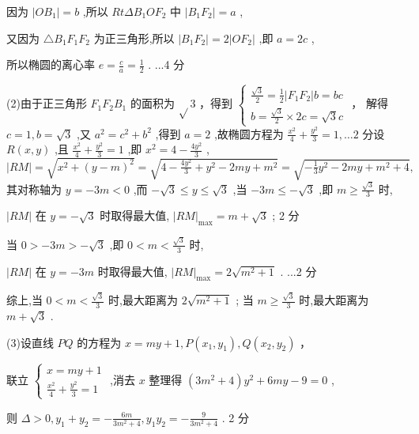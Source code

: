 \documentclass[10pt]{article}
\begin{document}
因为 \(\left| {O{B}_{1}}\right|  = b\) ,所以 \({Rt\Delta }{B}_{1}O{F}_{2}\) 中 \(\left| {{B}_{1}{F}_{2}}\right|  = a\) ,

又因为 \(\bigtriangleup {B}_{1}{F}_{1}{F}_{2}\) 为正三角形,所以 \(\left| {{B}_{1}{F}_{2}}\right|  = 2\left| {O{F}_{2}}\right|\) ,即 \(a = {2c}\) ,

所以椭圆的离心率 \(e = \frac{c}{a} = \frac{1}{2}\) . ...4 分

(2)由于正三角形 \({F}_{1}{F}_{2}{B}_{1}\) 的面积为 \(\sqrt{}3\) ，得到 \(\left\{  \begin{array}{l} \frac{\sqrt{3}}{2} = \frac{1}{2}\left| {{F}_{1}{F}_{2}}\right| b = {bc} \\  b = \frac{\sqrt{3}}{2} \times  {2c} = \sqrt{3}c \end{array}\right.\) ， 解得 \(c = 1,b = \sqrt{3}\) ,又 \({a}^{2} = {c}^{2} + {b}^{2}\) ,得到 \(a = 2\) ,故椭圆方程为 \(\frac{{x}^{2}}{4} + \frac{{y}^{2}}{3} = 1,\ldots 2\) 分设 \(R\left( {x,y}\right)\) ,且 \(\frac{{x}^{2}}{4} + \frac{{y}^{2}}{3} = 1\) ,即 \({x}^{2} = 4 - \frac{4{y}^{2}}{3}\) , \(\left| {RM}\right|  = \sqrt{{x}^{2} + {\left( y - m\right) }^{2}} = \sqrt{4 - \frac{4{y}^{2}}{3} + {y}^{2} - {2my} + {m}^{2}} = \sqrt{-\frac{1}{3}{y}^{2} - {2my} + {m}^{2} + 4},\) 其对称轴为 \(y =  - {3m} < 0\) ,而 \(- \sqrt{3} \leq  y \leq  \sqrt{3}\) ,当 \(- {3m} \leq   - \sqrt{3}\) ,即 \(m \geq  \frac{\sqrt{3}}{3}\) 时,

\(\left| {RM}\right|\) 在 \(y =  - \sqrt{3}\) 时取得最大值, \({\left| RM\right| }_{\max } = m + \sqrt{3}\) ; 2 分

当 \(0 >  - {3m} >  - \sqrt{3}\) ,即 \(0 < m < \frac{\sqrt{3}}{3}\) 时,

\(\left| {RM}\right|\) 在 \(y =  - {3m}\) 时取得最大值, \({\left| RM\right| }_{\max } = 2\sqrt{{m}^{2} + 1}\) . ...2 分

综上,当 \(0 < m < \frac{\sqrt{3}}{3}\) 时,最大距离为 \(2\sqrt{{m}^{2} + 1}\) ; 当 \(m \geq  \frac{\sqrt{3}}{3}\) 时,最大距离为 \(m + \sqrt{3}\) .

(3)设直线 \({PQ}\) 的方程为 \(x = {my} + 1,P\left( {{x}_{1},{y}_{1}}\right) ,Q\left( {{x}_{2},{y}_{2}}\right)\) ，

联立 \(\left\{  \begin{array}{l} x = {my} + 1 \\  \frac{{x}^{2}}{4} + \frac{{y}^{2}}{3} = 1 \end{array}\right.\) ,消去 \(x\) 整理得 \(\left( {3{m}^{2} + 4}\right) {y}^{2} + {6my} - 9 = 0\) ,

则 \(\Delta  > 0,{y}_{1} + {y}_{2} =  - \frac{6m}{3{m}^{2} + 4},{y}_{1}{y}_{2} =  - \frac{9}{3{m}^{2} + 4}\) . 2 分
\end{document}
